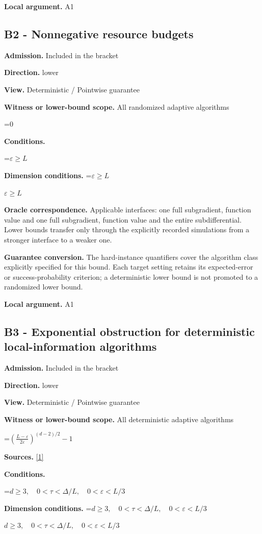 \documentclass[10pt,a4paper]{article}
\newcommand{\AtlasMath}[1]{\par\begingroup\centering\setbox0=\hbox{$\displaystyle #1$}\ifdim\wd0>1.4\linewidth\typeout{ATLAS WIDE FORMULA: \the\wd0}\fi\ifdim\wd0>\linewidth\resizebox{\linewidth}{!}{\box0}\else\box0\fi\par\endgroup}
\newcommand{\AtlasInlineMath}[1]{\begingroup\setbox0=\hbox{$#1$}\ifdim\wd0>.4\linewidth\endgroup\AtlasMath{#1}\else\endgroup$#1$\fi}
\begin{document}
\textbf{Local argument.} A1

\subsection{B2 - Nonnegative resource budgets}
\textbf{Admission.} Included in the bracket

\textbf{Direction.} lower

\textbf{View.} Deterministic / Pointwise guarantee

\textbf{Witness or lower-bound scope.} All randomized adaptive algorithms

\AtlasMath{0}
\textbf{Conditions.} 
\AtlasMath{\varepsilon\ge L}


\textbf{Dimension conditions.} \AtlasInlineMath{\varepsilon\ge L}

\textbf{Oracle correspondence.} Applicable interfaces: one full subgradient, function value and one full subgradient, function value and the entire subdifferential. Lower bounds transfer only through the explicitly recorded simulations from a stronger interface to a weaker one.

\textbf{Guarantee conversion.} The hard-instance quantifiers cover the algorithm class explicitly specified for this bound. Each target setting retains its expected-error or success-probability criterion; a deterministic lower bound is not promoted to a randomized lower bound.

\textbf{Local argument.} A1

\subsection{B3 - Exponential obstruction for deterministic local-information algorithms}
\textbf{Admission.} Included in the bracket

\textbf{Direction.} lower

\textbf{View.} Deterministic / Pointwise guarantee

\textbf{Witness or lower-bound scope.} All deterministic adaptive algorithms

\AtlasMath{\left(\frac{L-\varepsilon}{2\varepsilon}\right)^{(d-2)/2}-1}
\textbf{Sources.} \href{https://arxiv.org/pdf/2609.38082v2}{[1]}

\textbf{Conditions.} 
\AtlasMath{d\ge3,\quad0<\tau<\Delta/L,\quad0<\varepsilon<L/3}


\textbf{Dimension conditions.} \AtlasInlineMath{d\ge3,\quad0<\tau<\Delta/L,\quad0<\varepsilon<L/3}
\end{document}
